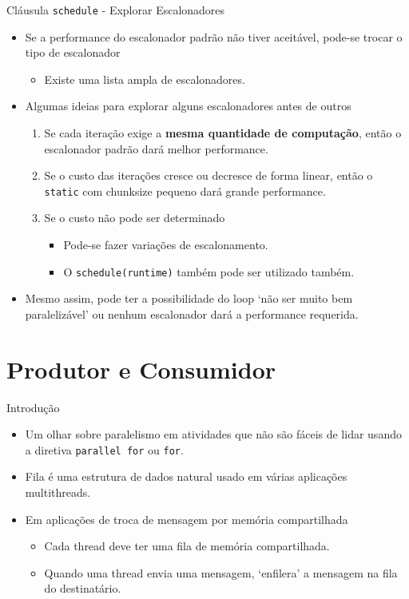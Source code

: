 	\begin{frame}{Cláusula {\tt schedule} - Explorar Escalonadores}
		\begin{itemize}
			\setlength\itemsep{1em}
			\item Se a performance do escalonador padrão não tiver aceitável, pode-se trocar o tipo de escalonador
			\begin{itemize}
				\item Existe uma lista ampla de escalonadores.
			\end{itemize}
			\item Algumas ideias para explorar alguns escalonadores antes de outros
			\begin{enumerate}
				\setlength\itemsep{0.8em}
				\item Se cada iteração exige a \textbf{mesma quantidade de computação}, então o escalonador padrão dará melhor performance.
				\item Se o custo das iterações cresce ou decresce de forma linear, então o {\tt static} com chunksize pequeno dará grande performance.
				\item Se o custo não pode ser determinado
				\begin{itemize}
				 	\item Pode-se fazer variações de escalonamento. 
				 	\item O {\tt schedule(runtime)} também pode ser utilizado também.
				 \end{itemize} 
			\end{enumerate}
					\bigskip
					\pause
			\item Mesmo assim, pode ter a possibilidade do loop `não ser muito bem paralelizável' ou nenhum escalonador dará a performance requerida.
		\end{itemize}
	\end{frame}









\section{Produtor e Consumidor}
	\begin{frame}{Introdução}
		\begin{itemize}
			\item Um olhar sobre paralelismo em atividades que não são fáceis de lidar usando a diretiva {\tt parallel for} ou {\tt for}.
			\bigskip
			\item Fila é uma estrutura de dados natural usado em várias aplicações multithreads.
			\item Em aplicações de troca de mensagem por memória compartilhada
			\begin{itemize}
				\item Cada thread deve ter uma fila de memória compartilhada.
				\item Quando uma thread envia uma mensagem, `enfilera' a mensagem na fila do destinatário.
			\end{itemize}
		\end{itemize}
	\end{frame}

